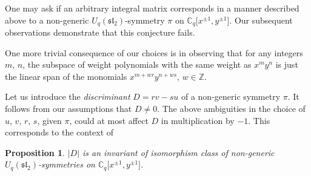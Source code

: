 \documentclass[pdftex]{sigma}
\numberwithin{equation}{section}
\newtheorem{Proposition}[Theorem]{Proposition}
 { \theoremstyle{definition}
\newtheorem{Definition}[Theorem]{Definition}
\newtheorem{Remark}[Theorem]{Remark} }
\begin{document}
One may ask if an arbitrary integral matrix corresponds in a manner described above to a non-generic $U_q(\mathfrak{sl}_2)$-symmetry $\pi$ on $\mathbb{C}_q\big[x^{\pm 1},y^{\pm 1}\big]$. Our subsequent observations demonstrate that this conjecture fails.

One more trivial consequence of our choices is in observing that for any integers $m$, $n$, the subspace of weight polynomials with the same weight as $x^my^n$ is just the linear span of the monomials $x^{m+wr}y^{n+ws}$, $w\in\mathbb{Z}$.

Let us introduce the {\it discriminant} $D=rv-su$ of a non-generic symmetry $\pi$. It follows from our assumptions that $D\ne 0$. The above ambiguities in the choice of $u$, $v$, $r$, $s$, given $\pi$, could at most affect $D$ in multiplication by $-1$. This corresponds to the context of

\begin{Proposition}\label{D_inv}$|D|$ is an invariant of isomorphism class of non-generic $U_q(\mathfrak{sl}_2)$-symmetries on $\mathbb{C}_q\big[x^{\pm 1},y^{\pm 1}\big]$.
\end{Proposition}
\end{document}
